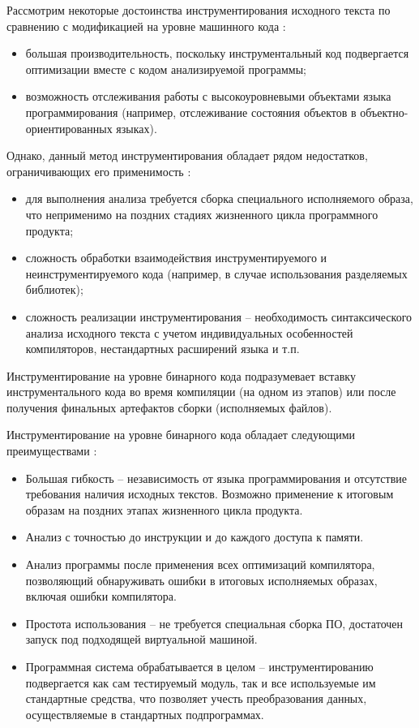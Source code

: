 Рассмотрим некоторые достоинства инструментирования исходного текста по сравнению с модификацией на уровне машинного кода \cite{lomakina2016testirovanie}:
\begin{itemize}[noitemsep]
  \item большая производительность, поскольку инструментальный код подвергается оптимизации вместе с кодом анализируемой программы;
  \item возможность отслеживания работы с высокоуровневыми объектами языка программирования (например, отслеживание состояния объектов в объектно-ориентированных языках).
\end{itemize}

Однако, данный метод инструментирования обладает рядом недостатков, ограничивающих его применимость \cite{lomakina2016testirovanie}:
\begin{itemize}[noitemsep]
  \item для выполнения анализа требуется сборка специального исполняемого образа, что неприменимо на поздних стадиях жизненного цикла программного продукта;
  \item сложность обработки взаимодействия инструментируемого и неинструментируемого кода (например, в случае использования разделяемых библиотек);
  \item сложность реализации инструментирования -- необходимость синтаксического анализа исходного текста с учетом индивидуальных особенностей компиляторов, нестандартных расширений языка и т.п.
\end{itemize}

Инструментирование на уровне бинарного кода подразумевает вставку инструментального кода во время компиляции (на одном из этапов) или после получения финальных артефактов сборки (исполняемых файлов).

Инструментирование на уровне бинарного кода обладает следующими преимуществами \cite{lomakina2016testirovanie}:
\begin{itemize}[noitemsep]
  \item Большая гибкость -- независимость от языка программирования и отсутствие требования наличия исходных текстов. Возможно применение к итоговым образам на поздних этапах жизненного цикла продукта.
  \item Анализ с точностью до инструкции и до каждого доступа к памяти.
  \item Анализ программы после применения всех оптимизаций компилятора, позволяющий обнаруживать ошибки в итоговых исполняемых образах, включая ошибки компилятора.
  \item Простота использования -- не требуется специальная сборка ПО, достаточен запуск под подходящей виртуальной машиной.
  \item Программная система обрабатывается в целом -- инструментированию подвергается как сам тестируемый модуль, так и все используемые им стандартные средства, что позволяет учесть преобразования данных, осуществляемые в стандартных подпрограммах.
\end{itemize}


